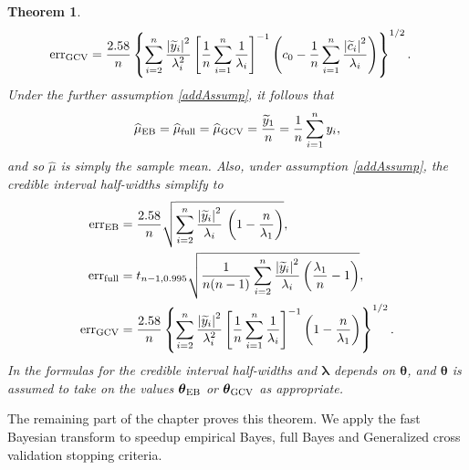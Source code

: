 \documentclass{iitthesis}          %
\newcommand{\bm}[1]{\boldsymbol{#1}}
\newcommand{\vlambda}{{\bm{\lambda}}}
\newcommand{\vtheta}{{\bm{\theta}}}
\newcommand{\hmu}{\widehat{\mu}}
\newcommand{\MLE}{\textup{EB}}
\newcommand{\full}{\textup{full}}
\newcommand{\GCV}{\textup{GCV}}
\newcommand{\err}{\textup{err}}
\def\abs#1{\ensuremath{\left \lvert #1 \right \rvert}}
\newtheorem{theorem}{Theorem}[section]
\begin{document}
\begin{theorem}
\begin{align}
	\nonumber
	\err_{\textup{GCV}} & =
	\frac{2.58}{n}\left\{\sum_{i=2}^n \frac{\abs{\widetilde{y}_i}^2}{\lambda_i^2}  \left [ \frac 1n \sum_{i=1}^n \frac{1}{\lambda_i} \right]^{-1} 
	\left( c_0 - \frac 1n \sum_{i=1}^n \frac{\abs{\widetilde{c}_i}^2}{\lambda_i} \right) 
	\right\}^{1/2}.
	\end{align}
	Under the further assumption \eqref{addAssump}, it follows that 
	\begin{equation}
	\label{muhatGCV-FB-MLE-Simple}
	\hmu_\MLE  = \hmu_{\full} = \hmu_{\GCV} =
	\frac{\widetilde{y}_1}{n} = \frac 1n \sum_{i=1}^n y_i,
	\end{equation}
	and so $\hmu$ is simply the sample mean.  Also, under assumption \eqref{addAssump}, the credible interval half-widths simplify to
	\begin{subequations}
		\label{errSimple}
		\begin{align}
		\label{eq:errMLEAllAsump}
		\err_\MLE  &
		=
		\frac{2.58}{n}\sqrt{
			\sum_{i=2}^{n} \frac{\abs{\widetilde{y}_i}^2}{\lambda_i}  
			\,
			\left( 1 -  \frac{n}{\lambda_1} \right) 
		}, \\
		\label{FJH:eq:errFullSimple}
		\err_{\textup{full}}
		&=
		t_{n-1,0.995}
		\sqrt{\frac{1}{n(n-1)} \sum_{i=2}^n \frac{\abs{\widetilde{y}_i}^2}{\lambda_i}  \left(\frac{\lambda_1}{n}  - 1  \right)}, \\
		\label{errGCVSimple}
		\err_{\textup{GCV}} & =
		\frac{2.58}{n}\left\{\sum_{i=2}^n \frac{\abs{\widetilde{y}_i}^2}{\lambda_i^2}  \left [ \frac 1n \sum_{i=1}^n \frac{1}{\lambda_i} \right]^{-1} 
		\left( 1 -  \frac{n}{\lambda_1} \right)  
		\right\}^{1/2}. 
		\end{align}
	\end{subequations}
	In the formulas for the credible interval half-widths and $\vlambda$ depends on $\vtheta$, and  $\vtheta$ is assumed to take on the values $\vtheta_{\MLE}$ or $\vtheta_{\GCV}$ as appropriate.
\end{theorem}
The remaining part of the chapter proves this theorem. We apply the fast Bayesian transform to speedup empirical Bayes, full Bayes and Generalized cross validation stopping criteria.


\fi






\end{document}
